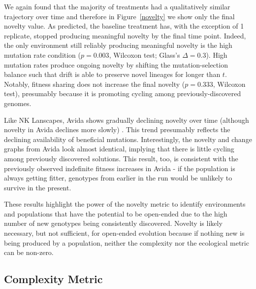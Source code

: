 \documentclass[letterpaper]{article}
\begin{document}
We again found that the majority of treatments had a qualitatively similar trajectory over time and therefore in Figure~\ref{novelty} we show only the final novelty value. As predicted, the baseline treatment has, with the exception of 1 replicate, stopped producing meaningful novelty by the final time point. Indeed, the only environment still reliably producing meaningful novelty is the high mutation rate condition ($p=0.003$, Wilcoxon test; Glass's $\Delta=0.3$). High mutation rates produce ongoing novelty by shifting the mutation-selection balance such that drift is able to preserve novel lineages for longer than $t$. Notably, fitness sharing does not increase the final novelty ($p=0.333$, Wilcoxon test), presumably because it is promoting cycling among previously-discovered genomes.

Like NK Lanscapes, Avida shows gradually declining novelty over time (although novelty in Avida declines more slowly) \citep{zenodo_dolson_data_2018}. This trend presumably reflects the declining availability of beneficial mutations. Interestingly, the novelty and change graphs from Avida look almost identical, implying that there is little cycling among previously discovered solutions. This result, too, is consistent with the previously observed indefinite fitness increases in Avida \citep{wiser_analysis_2015} - if the population is always getting fitter, genotypes from earlier in the run would be unlikely to survive in the present.

These results highlight the power of the novelty metric to identify environments and populations that have the potential to be open-ended due to the high number of new genotypes being consistently discovered. Novelty is likely necessary, but not sufficient, for open-ended evolution because if nothing new is being produced by a population, neither the complexity nor the ecological metric can be non-zero.

\subsection{Complexity Metric}
\end{document}
